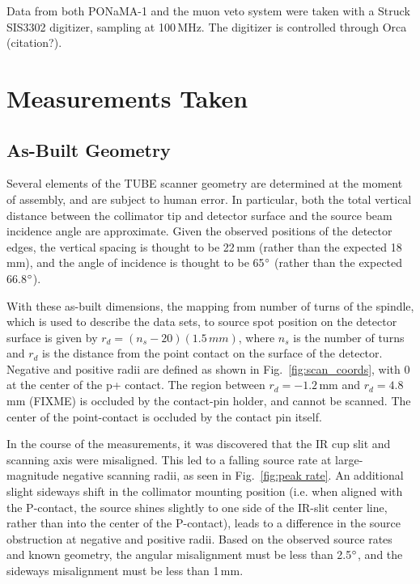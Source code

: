 \documentclass[groupedaddress,rmp,amsmath,amssymb,bibnotes,altaffilletter,twocolumn]{revtex4-1}
\begin{document}
Data from both PONaMA-1 and the muon veto system were taken with a Struck SIS3302 digitizer, sampling at 100\,MHz. The digitizer is controlled through Orca (citation?).

\section{Measurements Taken} \label{sec:measurements}
\subsection{As-Built Geometry} \label{ssec:geometry}
Several elements of the TUBE scanner geometry are determined at the moment of assembly, and are subject to human error. In particular, both the total vertical distance between the collimator tip and detector surface and the source beam incidence angle are approximate. Given the observed positions of the detector edges, the vertical spacing is thought to be 22\,mm (rather than the expected 18\,mm), and the angle of incidence is thought to be 65$\degree$ (rather than the expected 66.8$\degree$). 

With these as-built dimensions, the mapping from number of turns of the spindle, which is used to describe the data sets, to source spot position on the detector surface is given by $r_d = (n_s-20)(1.5\,mm)$, where $n_s$ is the number of turns and $r_d$ is the distance from the point contact on the surface of the detector. Negative and positive radii are defined as shown in Fig.~\ref{fig:scan_coords}, with 0 at the center of the p+ contact. The region between $r_d = -1.2$\,mm and  $r_d = 4.8$\,mm (FIXME) is occluded by the contact-pin holder, and cannot be scanned. The center of the point-contact is occluded by the contact pin itself. 

In the course of the measurements, it was discovered that the IR cup slit and scanning axis were misaligned. This led to a falling source rate at large-magnitude negative scanning radii, as seen in Fig.~\ref{fig:peak rate}. An additional slight sideways shift in the collimator mounting position (i.e. when aligned with the P-contact, the source shines slightly to one side of the IR-slit center line, rather than into the center of the P-contact), leads to a difference in the source obstruction at negative and positive radii. Based on the observed source rates and known geometry, the angular misalignment must be less than 2.5$\degree$, and the sideways misalignment must be less than 1\,mm. 
\end{document}
